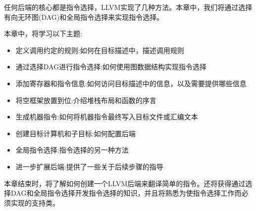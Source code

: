 任何后端的核心都是指令选择，LLVM实现了几种方法。本章中，我们将通过选择有向无环图(DAG)和全局指令选择来实现指令选择。

本章中，将学习以下主题:

\begin{itemize}
\item
定义调用约定的规则:如何在目标描述中，描述调用规则

\item
通过选择DAG进行指令选择:如何使用图数据结构实现指令选择

\item
添加寄存器和指令信息:如何访问目标描述中的信息，以及需要提供哪些信息

\item
将空框架放置到位:介绍堆栈布局和函数的序言

\item
生成机器指令:如何将机器指令最终写入目标文件或汇编文本

\item
创建目标计算机和子目标:如何配置后端

\item
全局指令选择:指令选择的另一种方法

\item
进一步扩展后端:提供了一些关于后续步骤的指导
\end{itemize}

本章结束时，将了解如何创建一个LLVM后端来翻译简单的指令。还将获得通过选择DAG和全局指令选择开发指令选择的知识，并且将熟悉为使指令选择工作而必须实现的支持类。









































